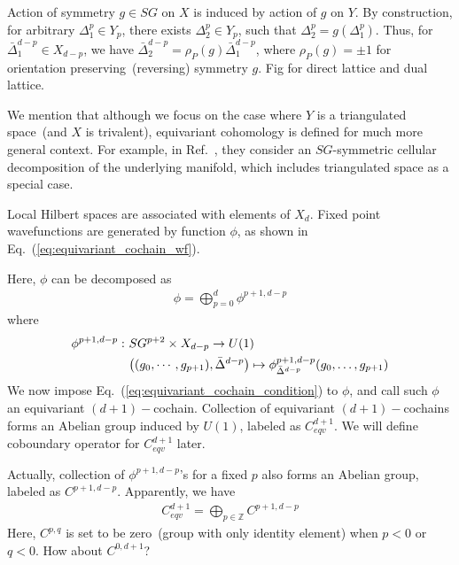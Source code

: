 \documentclass[%
  reprint,
  amsmath,amssymb,
  aps,pra,
]{revtex4-1}
\newcommand{\ZZ}{\mathbb{Z}} %
\begin{document}
Action of symmetry $g\in SG$ on $X$ is induced by action of $g$ on $Y$.
By construction, for arbitrary $\Delta^p_1\in Y_p$, there exists $\Delta^p_2\in Y_p$, such that $\Delta^p_2=g(\Delta^p_1)$.
Thus, for $\bar{\Delta}^{d-p}_1\in X_{d-p}$, we have $\bar{\Delta}_2^{d-p}=\rho_P(g)\bar{\Delta}^{d-p}_1$, where $\rho_P(g)=\pm1$ for orientation preserving~(reversing) symmetry $g$.
{\color{red} Fig for direct lattice and dual lattice.}

We mention that although we focus on the case where $Y$ is a triangulated space~(and $X$ is trivalent), equivariant cohomology is defined for much more general context. 
For example, in Ref.~\cite{SongFangQi2018SongFangQi2018,ElseThorngren2018crystalline}, they consider an $SG$-symmetric cellular decomposition of the underlying manifold, which includes triangulated space as a special case.

Local Hilbert spaces are associated with elements of $X_d$. 
Fixed point wavefunctions are generated by function $\phi$, as shown in Eq.~(\ref{eq:equivariant_cochain_wf}).

Here, $\phi$ can be decomposed as
\begin{align}
  \phi=\bigoplus_{p=0}^d\phi^{p+1,d-p}
  \label{}
\end{align}
where
\begin{align}
  \phi^{p+1,d-p}:~&SG^{p+2}\times X_{d-p}\rightarrow U(1)\notag\\
  &\big((g_0,\cdots,g_{p+1}),\bar{\Delta}^{d-p}\big) \mapsto \phi^{p+1,d-p}_{\bar{\Delta}^{d-p}}(g_0,\ldots,g_{p+1})
  \label{}
\end{align}
We now impose Eq.~(\ref{eq:equivariant_cochain_condition}) to $\phi$, and call such $\phi$ an equivariant $(d+1)-$cochain. 
Collection of equivariant $(d+1)-$cochains forms an Abelian group induced by $U(1)$, labeled as $C^{d+1}_{eqv}$. 
We will define coboundary operator for $C^{d+1}_{eqv}$ later.

Actually, collection of $\phi^{p+1,d-p}$'s for a fixed $p$ also forms an Abelian group, labeled as $C^{p+1,d-p}$.
Apparently, we have
\begin{align}
  C^{d+1}_{eqv}=\bigoplus_{p\in\ZZ} C^{p+1,d-p}
  \label{}
\end{align}
Here, $C^{p,q}$ is set to be zero~(group with only identity element) when $p<0$ or $q<0$.
{\color{red} How about $C^{0,d+1}$?}
\end{document}
